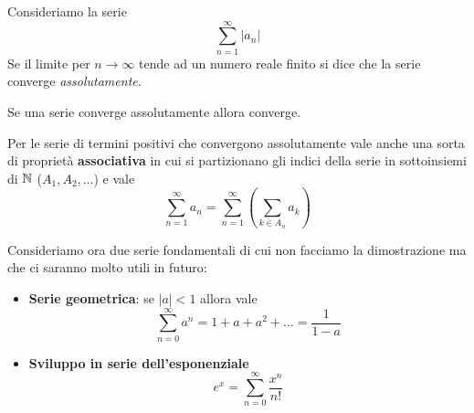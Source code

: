 \begin{definition}
	Consideriamo la serie
	\[ \sum_{n=1}^\infty |a_n| \]
	Se il limite per $n \to \infty$ tende ad un numero reale finito si dice che la serie converge
	\emph{assolutamente}.
\end{definition}

\begin{theorem}
	Se una serie converge assolutamente allora converge.
\end{theorem}

Per le serie di termini positivi che convergono assolutamente vale anche una sorta di proprietà
\textbf{associativa} in cui si partizionano gli indici della serie in sottoinsiemi di $\mathbb{N}$
($A_1, A_2, \dots$) e vale
\[ \sum_{n=1}^\infty a_n = \sum_{n=1}^\infty \left( \sum_{k \in A_n} a_k \right) \]

Consideriamo ora due serie fondamentali di cui non facciamo la dimostrazione ma che ci saranno
molto utili in futuro:
\begin{itemize}
	\item \textbf{Serie geometrica}: se $|a| < 1$ allora vale
	      \[ \sum_{n=0}^\infty a^n = 1 + a + a^2 + \dots = \frac{1}{1 - a} \]
	\item \textbf{Sviluppo in serie dell'esponenziale}
	      \[ e^x = \sum_{n=0}^\infty \frac{x^n}{n!} \]
\end{itemize}
